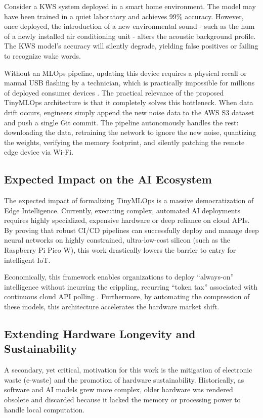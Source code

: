 \documentclass[11pt,a4paper,openany]{book}
\begin{document}
Consider a KWS system deployed in a smart home environment. The model may have been trained in a quiet laboratory and achieves 99\% accuracy. However, once deployed, the introduction of a new environmental sound - such as the hum of a newly installed air conditioning unit - alters the acoustic background profile. The KWS model's accuracy will silently degrade, yielding false positives or failing to recognize wake words.

Without an MLOps pipeline, updating this device requires a physical recall or manual USB flashing by a technician, which is practically impossible for millions of deployed consumer devices \cite{11}. The practical relevance of the proposed TinyMLOps architecture is that it completely solves this bottleneck. When data drift occurs, engineers simply append the new noise data to the AWS S3 dataset and push a single Git commit. The pipeline autonomously handles the rest: downloading the data, retraining the network to ignore the new noise, quantizing the weights, verifying the memory footprint, and silently patching the remote edge device via Wi-Fi.

\subsection{Expected Impact on the AI Ecosystem}
The expected impact of formalizing TinyMLOps is a massive democratization of Edge Intelligence. Currently, executing complex, automated AI deployments requires highly specialized, expensive hardware or deep reliance on cloud APIs. By proving that robust CI/CD pipelines can successfully deploy and manage deep neural networks on highly constrained, ultra-low-cost silicon (such as the Raspberry Pi Pico W), this work drastically lowers the barrier to entry for intelligent IoT.

Economically, this framework enables organizations to deploy ``always-on'' intelligence without incurring the crippling, recurring ``token tax'' associated with continuous cloud API polling \cite{2}. Furthermore, by automating the compression of these models, this architecture accelerates the hardware market shift.

\subsection{Extending Hardware Longevity and Sustainability}
A secondary, yet critical, motivation for this work is the mitigation of electronic waste (e-waste) and the promotion of hardware sustainability. Historically, as software and AI models grew more complex, older hardware was rendered obsolete and discarded because it lacked the memory or processing power to handle local computation.
\end{document}
